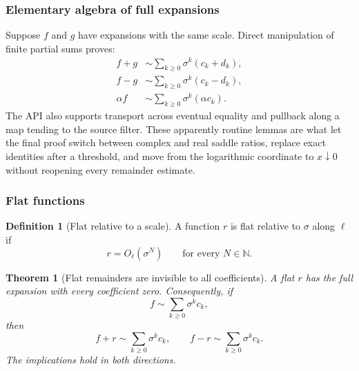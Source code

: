 \documentclass[11pt,oneside]{article}
\newtheorem{theorem}{Theorem}[section]
\theoremstyle{definition}
\newtheorem{definition}[definition]{Definition}
\theoremstyle{remark}
\newcommand{\N}{\mathbb N}
\begin{document}
\subsubsection{Elementary algebra of full expansions}

Suppose $f$ and $g$ have expansions with the same scale.  Direct manipulation of finite
partial sums proves:
\begin{align}
 f+g&\sim\sum_{k\ge0}\sigma^k(c_k+d_k),                    \label{integration:eq:expansion-add}\\
 f-g&\sim\sum_{k\ge0}\sigma^k(c_k-d_k),                    \label{integration:eq:expansion-sub}\\
 \alpha f&\sim\sum_{k\ge0}\sigma^k(\alpha c_k).            \label{integration:eq:expansion-smul}
\end{align}
The API also supports transport across eventual equality and pullback along a map tending to
the source filter.  These apparently routine lemmas are what let the final proof switch
between complex and real saddle ratios, replace exact identities after a threshold, and move
from the logarithmic coordinate to $x\downarrow0$ without reopening every remainder
estimate.

\subsubsection{Flat functions}

\begin{definition}[Flat relative to a scale]
\label{integration:def:flat-scale}
A function $r$ is flat relative to $\sigma$ along $\ell$ if
\begin{equation}
 r=O_{\ell}(\sigma^N)
 \qquad\text{for every }N\in\N.
 \label{integration:eq:flat-all-orders}
\end{equation}
\end{definition}

\begin{theorem}[Flat remainders are invisible to all coefficients]
\label{integration:thm:flat-invisible}
A flat $r$ has the full expansion with every coefficient zero.  Consequently, if
\begin{equation}
 f\sim\sum_{k\ge0}\sigma^kc_k,
 \label{integration:eq:f-exp-before-flat}
\end{equation}
then
\begin{equation}
 f+r\sim\sum_{k\ge0}\sigma^kc_k,
 \qquad
 f-r\sim\sum_{k\ge0}\sigma^kc_k.
 \label{integration:eq:flat-preserves-expansion}
\end{equation}
The implications hold in both directions.
\end{theorem}
\end{document}
